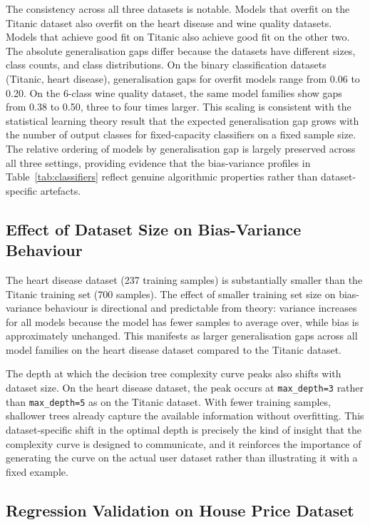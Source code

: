 \documentclass[conference]{IEEEtran}
\begin{document}
The consistency across all three datasets is notable. Models that overfit on the Titanic dataset also overfit on the heart disease and wine quality datasets. Models that achieve good fit on Titanic also achieve good fit on the other two. The absolute generalisation gaps differ because the datasets have different sizes, class counts, and class distributions. On the binary classification datasets (Titanic, heart disease), generalisation gaps for overfit models range from 0.06 to 0.20. On the 6-class wine quality dataset, the same model families show gaps from 0.38 to 0.50, three to four times larger. This scaling is consistent with the statistical learning theory result that the expected generalisation gap grows with the number of output classes for fixed-capacity classifiers on a fixed sample size. The relative ordering of models by generalisation gap is largely preserved across all three settings, providing evidence that the bias-variance profiles in Table~\ref{tab:classifiers} reflect genuine algorithmic properties rather than dataset-specific artefacts.

\subsection{Effect of Dataset Size on Bias-Variance Behaviour}

The heart disease dataset (237 training samples) is substantially smaller than the Titanic training set (700 samples). The effect of smaller training set size on bias-variance behaviour is directional and predictable from theory: variance increases for all models because the model has fewer samples to average over, while bias is approximately unchanged. This manifests as larger generalisation gaps across all model families on the heart disease dataset compared to the Titanic dataset.

The depth at which the decision tree complexity curve peaks also shifts with dataset size. On the heart disease dataset, the peak occurs at \texttt{max\_depth=3} rather than \texttt{max\_depth=5} as on the Titanic dataset. With fewer training samples, shallower trees already capture the available information without overfitting. This dataset-specific shift in the optimal depth is precisely the kind of insight that the complexity curve is designed to communicate, and it reinforces the importance of generating the curve on the actual user dataset rather than illustrating it with a fixed example.

\subsection{Regression Validation on House Price Dataset}
\end{document}
